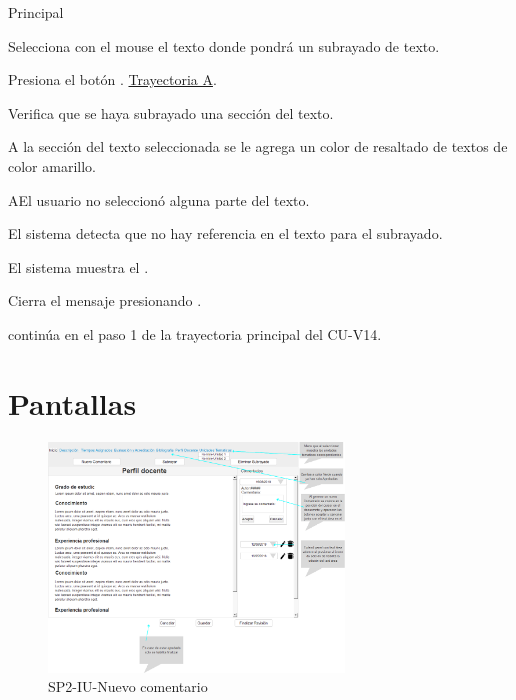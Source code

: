 \begin{UCtrayectoria}{Principal}

    \UCpaso[\UCactor] Selecciona con el mouse el texto donde pondrá un subrayado de texto.

    \UCpaso[\UCactor] Presiona el botón . \hyperref[SP2-CU17-A]{Trayectoria A}. 
    
    \UCpaso Verifica que se haya subrayado una sección del texto. 
    
    \UCpaso A la sección del texto seleccionada se le agrega un color de resaltado de textos de color amarillo.

\end{UCtrayectoria}

\label{SP2-CU17-A}
\begin{UCtrayectoriaA}{A}{El usuario no seleccionó alguna parte del texto.}

	\UCpaso El sistema detecta que no hay referencia en el texto para el subrayado.

  \UCpaso El sistema muestra el .

  \UCpaso[\UCactor] Cierra el mensaje presionando .

  \UCpaso continúa en el paso 1 de la trayectoria principal del CU-V14.
\end{UCtrayectoriaA}

\chapter{Pantallas}
 \begin{figure}
  \centering
    \includegraphics[width=0.7\textwidth]{DCU/SP2/Pantallas/Nuevo_comentario}
  \caption{SP2-IU-Nuevo comentario}
  \label{SP2-IU-Nuevo_comentario}
\end{figure}
